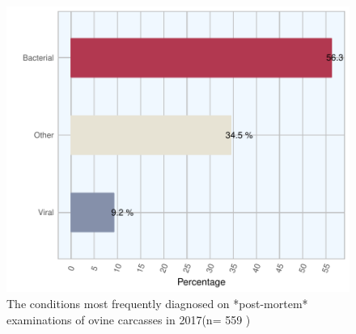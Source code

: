 \documentclass[]{book}
\begin{document}
\begin{figure}

{\centering \includegraphics{AFBI_files/figure-latex/unnamed-chunk-22-1} 

}

\caption{The conditions most frequently diagnosed on *post-mortem* examinations of  ovine carcasses in 2017(n= 559 )}\label{fig:unnamed-chunk-22}
\end{figure}
\end{document}
